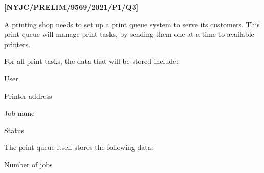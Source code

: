 \item \textbf{{[}NYJC/PRELIM/9569/2021/P1/Q3{]} }

A printing shop needs to set up a print queue system to serve its
customers. This print queue will manage print tasks, by sending them
one at a time to available printers.

For all print tasks, the data that will be stored include: 

\noindent %
\noindent\begin{minipage}[t]{1\columnwidth}%
\texttt{\qquad{}}User 

\texttt{\qquad{}}Printer address 

\texttt{\qquad{}}Job name 

\texttt{\qquad{}}Status %
\end{minipage}

The print queue itself stores the following data: 

\texttt{\qquad{}}Number of jobs 

